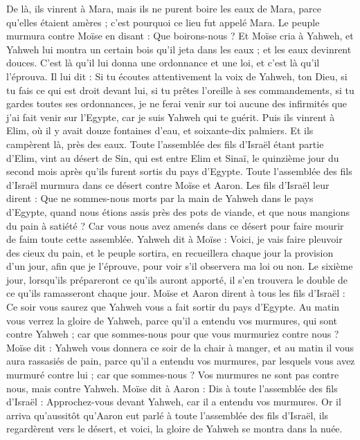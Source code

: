 \begin{multicols}{2}
De là, ils vinrent à Mara, mais ils ne purent boire les eaux de Mara, parce qu'elles étaient amères ; c'est pourquoi ce lieu fut appelé Mara.
Le peuple murmura contre Moïse en disant : Que boirons-nous ?
Et Moïse cria à Yahweh, et Yahweh lui montra\FTNT{} un certain bois qu'il jeta dans les eaux ; et les eaux devinrent douces. C'est là qu'il lui donna une ordonnance et une loi, et c'est là qu'il l'éprouva.
Il lui dit : Si tu écoutes attentivement la voix de Yahweh, ton Dieu, si tu fais ce qui est droit devant lui, si tu prêtes l'oreille à ses commandements, si tu gardes toutes ses ordonnances, je ne ferai venir sur toi aucune des infirmités que j'ai fait venir sur l'Egypte, car je suis Yahweh qui te guérit\FTNT{}.
Puis ils vinrent à Elim, où il y avait douze fontaines d'eau, et soixante-dix palmiers. Et ils campèrent là, près des eaux.
\VerseOne{}Toute l'assemblée des fils d'Israël étant partie d'Elim, vint au désert de Sin, qui est entre Elim et Sinaï, le quinzième jour du second mois après qu'ils furent sortis du pays d'Egypte.
Toute l'assemblée des fils d'Israël murmura dans ce désert contre Moïse et Aaron.
Les fils d'Israël leur dirent : Que ne sommes-nous morts par la main de Yahweh dans le pays d'Egypte, quand nous étions assis près des pots de viande, et que nous mangions du pain à satiété ? Car vous nous avez amenés dans ce désert pour faire mourir de faim toute cette assemblée\FTNT{}.
Yahweh dit à Moïse : Voici, je vais faire pleuvoir des cieux du pain, et le peuple sortira, en recueillera chaque jour la provision d'un jour, afin que je l'éprouve, pour voir s'il observera ma loi ou non.
Le sixième jour, lorsqu’ils prépareront ce qu’ils auront apporté, il s’en trouvera le double de ce qu’ils ramasseront chaque jour.
Moïse et Aaron dirent à tous les fils d'Israël : Ce soir vous saurez que Yahweh vous a fait sortir du pays d'Egypte.
Au matin vous verrez la gloire de Yahweh, parce qu'il a entendu vos murmures, qui sont contre Yahweh ; car que sommes-nous pour que vous murmuriez contre nous ?
Moïse dit : Yahweh vous donnera ce soir de la chair à manger, et au matin il vous aura rassasiés de pain, parce qu'il a entendu vos murmures, par lesquels vous avez murmuré contre lui ; car que sommes-nous ? Vos murmures ne sont pas contre nous, mais contre Yahweh.
Moïse dit à Aaron : Dis à toute l'assemblée des fils d'Israël : Approchez-vous devant Yahweh, car il a entendu vos murmures.
Or il arriva qu'aussitôt qu'Aaron eut parlé à toute l'assemblée des fils d'Israël, ils regardèrent vers le désert, et voici, la gloire de Yahweh se montra dans la nuée.

\end{multicols}
